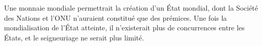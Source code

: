 \documentclass[a4paper,notitlepage]{article}
\newcommand{\eng}[1]{{\NoAutoSpaceBeforeFDP\emph{#1}}}  %
\newcommand{\sfootnote}{\,\footnote}
\begin{document}

Une monnaie mondiale permettrait la création d'un État mondial, dont la Société des Nations et l'ONU n'auraient constitué que des prémices. Une fois la mondialisation de l'État atteinte, il n'existerait plus de concurrences entre les États, et le seigneuriage ne serait plus limité.
\end{document}
